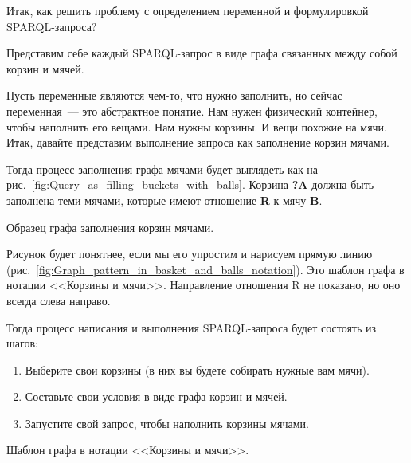 Итак, как решить проблему с определением переменной и формулировкой SPARQL-запроса?

Представим себе каждый SPARQL-запрос в виде графа связанных между собой корзин и мячей.

Пусть переменные являются чем-то, что нужно заполнить, но сейчас переменная~--- это абстрактное понятие. Нам нужен физический контейнер, чтобы наполнить его вещами. Нам нужны корзины. И вещи похожие на мячи. Итак, давайте представим выполнение запроса как заполнение корзин мячами.

Тогда процесс заполнения графа мячами будет выглядеть как на рис.~\ref{fig:Query_as_filling_buckets_with_balls}. Корзина \textbf{?A} должна быть заполнена теми мячами, которые имеют отношение \textbf{R} к мячу \textbf{B}.

\newpage
\begin{marginfigure}[0cm]
	{
		\setlength{\fboxsep}{0pt}%
		\setlength{\fboxrule}{1pt}%
	}
    \caption{Образец графа заполнения корзин мячами.}
	\label{fig:Query_as_filling_buckets_with_balls}
\end{marginfigure}

Рисунок будет понятнее, если мы его упростим и нарисуем прямую линию (рис.~\ref{fig:Graph_pattern_in_basket_and_balls_notation}). Это шаблон графа в нотации <<Корзины и мячи>>. Направление отношения R не показано, но оно всегда слева направо.

Тогда процесс написания и выполнения SPARQL-запроса будет состоять из шагов:
\begin{enumerate}
    \item Выберите свои корзины (в них вы будете собирать нужные вам мячи).
    \item Составьте свои условия в виде графа корзин и мячей.
    \item Запустите свой запрос, чтобы наполнить корзины мячами.
\end{enumerate}


\begin{marginfigure}[2\baselineskip]
	{
		\setlength{\fboxsep}{0pt}%
		\setlength{\fboxrule}{1pt}%
	}
    \caption{Шаблон графа в нотации <<Корзины и мячи>>.}
	\label{fig:Graph_pattern_in_basket_and_balls_notation}
\end{marginfigure}

